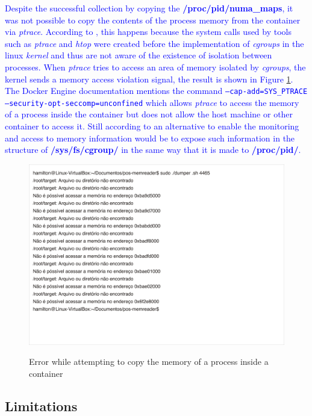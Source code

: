\documentclass[conference]{IEEEtran}
\begin{document}
\textcolor{blue}{Despite the successful collection by copying the \textbf{/proc/pid/numa\_maps}, it was not possible to copy the contents of the process memory from the container via \textit{ptrace}.
%
According to \cite{cgroupsxptrace}, this happens because the system calls used by tools such as \textit{ptrace} and \textit{htop} were created before the implementation of \textit{cgroups} in the linux \textit{kernel} and thus are not aware of the existence of isolation between processes.
%
When \textit{ptrace} tries to access an area of memory isolated by \textit{cgroups}, the kernel sends a memory access violation signal, the result is shown in Figure \ref{fig:erro-copia-gdb}.
%
The Docker Engine \cite{capabilities} documentation mentions the command \texttt{--cap-add=SYS\_PTRACE --security-opt-seccomp=unconfined} which allows \textit{ptrace} to access the memory of a process inside the container but does not allow the host machine or other container to access it.
%
Still according to \cite{cgroupsxptrace} an alternative to enable the monitoring and access to memory information would be to expose such information in the structure of \textbf{/sys/fs/cgroup/} in the same way that it is made to \textbf{/proc/pid/}.}

\begin{figure}[htb!]
\footnotesize
\caption{Error while attempting to copy the memory of a process inside a container}
\includegraphics[scale=0.21]{nao-consido-dumpar-memoria.jpg}
\centering
\label{fig:erro-copia-gdb}
\end{figure}


\subsection{Limitations}
\end{document}
